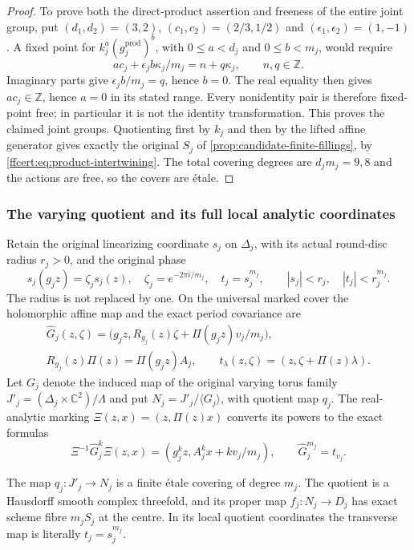\begin{proof}
To prove both the direct-product assertion and freeness of the entire
joint group, put $(d_1,d_2)=(3,2)$, $(c_1,c_2)=(2/3,1/2)$ and
$(\epsilon_1,\epsilon_2)=(1,-1)$. A fixed point for $k_j^a
(g_j^{\mathrm{prod}})^b$, with $0\le a<d_j$ and $0\le b<m_j$,
would require
\[
 ac_j+\epsilon_jb\kappa_j/m_j=n+q\kappa_j,
 \qquad n,q\in\mathbb Z.
 \tag{FF22}\label{ffcert:eq:joint-freeness}
\]
Imaginary parts give $\epsilon_jb/m_j=q$, hence $b=0$. The real
equality then gives $ac_j\in\mathbb Z$, hence $a=0$ in its stated
range. Every nonidentity pair is therefore fixed-point free; in
particular it is not the identity transformation. This proves the
claimed joint groups. Quotienting first by $k_j$ and then by the lifted
affine generator gives exactly the original $S_j$ of
\cref{prop:candidate-finite-fillings}, by
\eqref{ffcert:eq:product-intertwining}. The total covering degrees are
$d_jm_j=9,8$ and the actions are free, so the covers are \'etale.
\end{proof}

\subsubsection{The varying quotient and its full local analytic coordinates}

Retain the original linearizing coordinate $s_j$ on $\Delta_j$, with
its actual round-disc radius $r_j>0$, and the original phase
\[
 s_j(g_jz)=\zeta_js_j(z),\quad
 \zeta_j=e^{-2\pi i/m_j},\quad t_j=s_j^{m_j},
 \qquad |s_j|<r_j,\quad |t_j|<r_j^{m_j}.
 \tag{FF23}\label{ffcert:eq:disc-and-phase}
\]
The radius is not replaced by one. On the universal marked cover the
holomorphic affine map and the exact period covariance are
\[
\begin{gathered}
 \widehat G_j(z,\zeta)
  =\bigl(g_jz,R_{g_j}(z)\zeta+\Pi(g_jz)v_j/m_j\bigr),\\
 R_{g_j}(z)\Pi(z)=\Pi(g_jz)A_j,
 \qquad t_\lambda(z,\zeta)=(z,\zeta+\Pi(z)\lambda).
\end{gathered}
\tag{FF24}\label{ffcert:eq:varying-action}
\]
Let $G_j$ denote the induced map of the original varying torus family
$J'_j=(\Delta_j\times\mathbb C^2)/\Lambda$ and put
$N_j=J'_j/\langle G_j\rangle$, with quotient map $q_j$.
The real-analytic marking $\Xi(z,x)=(z,\Pi(z)x)$ converts its powers
to the exact formulas
\[
 \Xi^{-1}\widehat G_j^k\Xi(z,x)
   =(g_j^kz,A_j^kx+kv_j/m_j),\qquad
 \widehat G_j^{m_j}=t_{v_j}.
 \tag{FF25}\label{ffcert:eq:varying-powers}
\]

\begin{proposition}
\label{ffcert:prop:quotient-charts}
The map $q_j:J'_j\to N_j$ is a finite \'etale covering of degree
$m_j$. The quotient is a Hausdorff smooth complex threefold, and its
proper map $f_j:N_j\to D_j$ has exact scheme fibre $m_jS_j$ at the
centre. In its local quotient coordinates the transverse map is
literally $t_j=s_j^{m_j}$.
\end{proposition}

